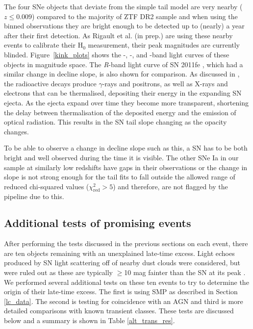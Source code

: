 \documentclass[a4paper,oneside,12pt, class=Latex/Classes/PhDthesisPSnPDF, crop=false]{standalone}
\begin{document}
The four SNe objects that deviate from the simple tail model are very nearby ($z \leq 0.009$) compared to the majority of ZTF DR2 sample and when using the binned observations they are bright enough to be detected up to (nearly) a year after their first detection. As Rigault et al. (in prep.) are using these nearby events to calibrate their H$_0$ measurement, their peak magnitudes are currently blinded. Figure~\ref{kink_plots} shows the \ztfg-, \ztfr-, and \ztfi-band light curves of these objects in magnitude space. The \textit{R}-band light curve of SN 2011fe \citep{spec_Lijiang-2.4m}, which had a similar change in decline slope, is also shown for comparison. As discussed in \citet{Georgios_11fe}, the radioactive decays produce $\gamma$-rays and positrons, as well as X-rays and electrons that can be thermalised, depositing their energy in the expanding SN ejecta. As the ejecta expand over time they become more transparent, shortening the delay between thermalisation of the deposited energy and the emission of optical radiation. This results in the SN tail slope changing as the opacity changes.

To be able to observe a change in decline slope such as this, a SN has to be both bright and well observed during the time it is visible. The other SNe Ia in our sample at similarly low redshifts have gaps in their observations or the change in slope is not strong enough for the tail fits to fall outside the allowed range of reduced chi-squared values ($\chi^2_\text{red} > 5$) and therefore, are not flagged by the pipeline due to this.


\subsection{Additional tests of promising events}
\label{Additional_tests}
After performing the tests discussed in the previous sections on each event, there are ten objects remaining with an unexplained late-time excess. Light echoes produced by SN light scattering off of nearby dust clouds were considered, but were ruled out as these are typically $\geq$10 mag fainter than the SN at its peak \citep{Patat_light_echoes, 2012cg}. We performed several additional tests on these ten events to try to determine the origin of their late-time excess. The first is using SMP as described in Section \ref{lc_data}. The second is testing for coincidence with an AGN and third is more detailed comparisons with known transient classes. These tests are discussed below and a summary is shown in Table \ref{alt_trans_res}.
\end{document}
